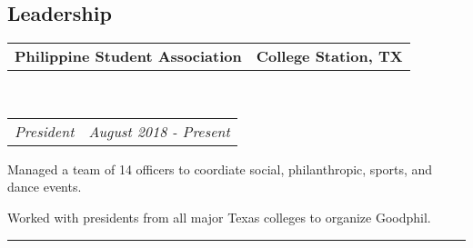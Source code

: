 \documentclass[10pt,letterpaper]{article}
\makeatletter
\newenvironment{indentsection}[1]%
{\begin{list}{}%
	{\setlength{\leftmargin}{#1}}%
	\item[]%
}
{\end{list}}
\newcommand{\headerrow}[2]
{\begin{tabular*}{\linewidth}{l@{\extracolsep{\fill}}r}
	#1 &
	#2 \\
\end{tabular*}}
\makeatother
\begin{document}
\subsection*{Leadership}
\begin{indentsection}{\parindent}
	\vspace{-0.4em}
	\headerrow
		{\textbf{Philippine Student Association}}
		{\textbf{College Station, TX}}
		\\
	\headerrow
		{\emph{President}}
		{\emph{August 2018 - Present}}
	\begin{itemize*}
		\item Managed a team of 14 officers to coordiate social, philanthropic, sports, and dance 			events. 
		\item Worked with presidents from all major Texas colleges to organize Goodphil.  
	\end{itemize*}

\end{indentsection}

\hrule
\vspace{-0.8em}
\end{document}
